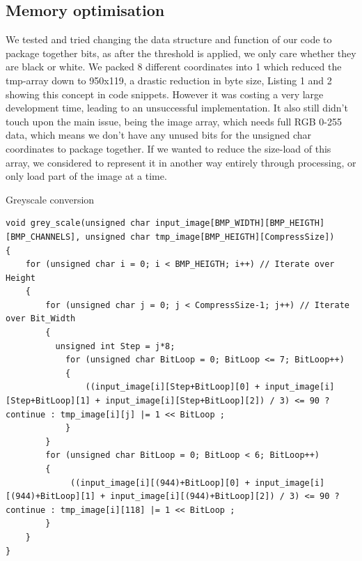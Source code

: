 \documentclass[a4paper, english]{article}
\numberwithin{equation}{section}
\begin{document}
\subsection{Memory optimisation}
We tested and tried changing the data structure and function of our code to package together bits, as after the threshold is applied, we only care whether they are black or white. We packed 8 different coordinates into 1 which reduced the tmp-array down to 950x119, a drastic reduction in byte size, Listing 1 and 2 showing this concept in code snippets. However it was costing a very large development time, leading to an unsuccessful implementation. It also still didn't touch upon the main issue, being the image array, which needs full RGB 0-255 data, which means we don't have any unused bits for the unsigned char coordinates to package together. If we wanted to reduce the size-load of this array, we considered to represent it in another way entirely through processing, or only load part of the image at a time.
\begin{listing}[H]
    \caption{Greyscale conversion}\label{lst:grey-scale}
    \begin{verbatim}
void grey_scale(unsigned char input_image[BMP_WIDTH][BMP_HEIGTH][BMP_CHANNELS], unsigned char tmp_image[BMP_HEIGTH][CompressSize])
{
    for (unsigned char i = 0; i < BMP_HEIGTH; i++) // Iterate over Height
    {
        for (unsigned char j = 0; j < CompressSize-1; j++) // Iterate over Bit_Width
        {
		  unsigned int Step = j*8;
		    for (unsigned char BitLoop = 0; BitLoop <= 7; BitLoop++)
            {
                ((input_image[i][Step+BitLoop][0] + input_image[i][Step+BitLoop][1] + input_image[i][Step+BitLoop][2]) / 3) <= 90 ? continue : tmp_image[i][j] |= 1 << BitLoop ; 
		    }                                                                                                    
        }
        for (unsigned char BitLoop = 0; BitLoop < 6; BitLoop++)
        {
             ((input_image[i][(944)+BitLoop][0] + input_image[i][(944)+BitLoop][1] + input_image[i][(944)+BitLoop][2]) / 3) <= 90 ? continue : tmp_image[i][118] |= 1 << BitLoop ;
        }
    }
}
\end{verbatim}
\end{listing}
\end{document}
